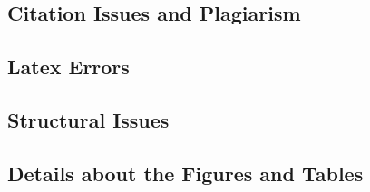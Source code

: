 \subsection{Citation Issues and Plagiarism}

\subsection{Latex Errors}

\subsection{Structural Issues}

\subsection{Details about the Figures and Tables}

